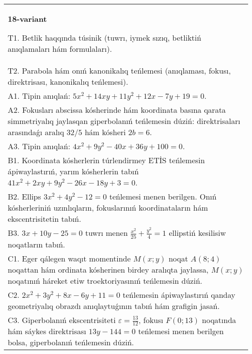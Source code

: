\documentclass{article}
\begin{document}
\begin{tabular}{m{17cm}}
\textbf{18-variant}
\newline

T1. Betlik haqqında túsinik (tuwrı, iymek sızıq, betliktiń anıqlamaları hám formulaları).\\

T2. Parabola hám onıń kanonikalıq teńlemesi (anıqlaması, fokusı, direktrisası, kanonikalıq teńlemesi).\\

A1. Tipin anıqlań: $5 x^{2}+14 xy+11 y^{2}+12 x-7 y+19=0$.\\

A2. Fokusları abscissa kósherinde hám koordinata basına qarata simmetriyalıq jaylasqan giperbolanıń teńlemesin dúziń: direktrisaları arasındaǵı aralıq $32/5$ hám kósheri $2 b=6$.\\

A3. Tipin anıqlań: $4 x^2+9 y^2-40 x+36 y+100=0$.\\

B1. Koordinata kósherlerin túrlendirmey ETİS teńlemesin ápiwaylastırıń, yarım kósherlerin tabıń $41x^{2} + 2xy + 9y^{2} - 26x - 18y + 3 = 0$.  \\

B2. Ellips $3x^{2} + 4y^{2} - 12 = 0$ teńlemesi menen berilgen. Onıń kósherleriniń uzınlıqların, fokuslarınıń koordinataların hám ekscentrisitetin tabıń.  \\

B3. $3x + 10y - 25 = 0$ tuwrı menen $\frac{x^{2}}{25} + \frac{y^{2}}{4} = 1$ ellipstiń kesilisiw noqatların tabıń.\\

C1. Eger qálegen waqıt momentinde $M(x;y)$ noqat $A(8;4)$ noqattan hám ordinata kósherinen birdey aralıqta jaylassa, $M(x;y)$ noqatınıń háreket etiw troektoriyasınıń teńlemesin dúziń.  \\

C2. $2x^{2} + 3y^{2} + 8x - 6y + 11 = 0$ teńlemesin ápiwaylastırıń qanday geometriyalıq obrazdı anıqlaytuǵının tabıń hám grafigin jasań.\\

C3. Giperbolanıń ekscentrisiteti $\varepsilon = \frac{13}{12}$, fokusı $F(0;13)$ noqatında hám sáykes direktrisası $13y - 144 = 0$ teńlemesi menen berilgen bolsa, giperbolanıń teńlemesin dúziń.  \\

\end{tabular}
\vspace{1cm}
\end{document}
